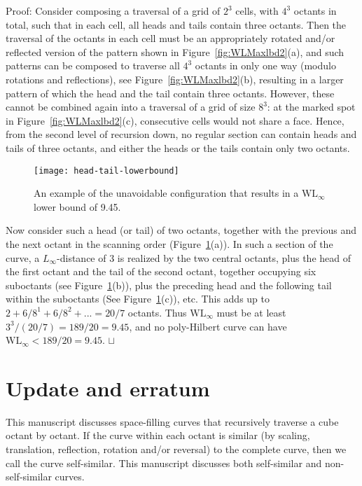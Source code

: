 \documentclass[11pt,a4paper]{article}
\def\WLMax{\ensuremath{\mathrm{WL}_\infty}\xspace}
\newenvironment{proof}{Proof:}{\qed}
\def\squareforqed{\hbox{\rlap{$\sqcap$}$\sqcup$}}
\def\qed{\ifmmode\squareforqed\else{\unskip\nobreak\hfil
\penalty50\hskip1em\null\nobreak\hfil\squareforqed
\parfillskip=0pt\finalhyphendemerits=0\endgraf}\fi}
\begin{document}
\begin{proof}
Consider composing a traversal of a grid of $2^3$ cells, with $4^3$ octants in total, such that in each cell, all heads and tails contain three octants. Then the traversal of the octants in each cell must be an appropriately rotated and/or reflected version of the pattern shown in Figure~\ref{fig:WLMaxlbd2}(a), and such patterns can be composed to traverse all $4^3$ octants in only one way (modulo rotations and reflections), see Figure~\ref{fig:WLMaxlbd2}(b), resulting in a larger pattern of which the head and the tail contain three octants. However, these cannot be combined again into a traversal of a grid of size $8^3$: at the marked spot in Figure~\ref{fig:WLMaxlbd2}(c), consecutive cells would not share a face. Hence, from the second level of recursion down, no regular section can contain heads and tails of three octants, and either the heads or the tails contain only two octants.

\begin{figure}
\centering
\texttt{[image: head-tail-lowerbound]}
\caption{An example of the unavoidable configuration that results in a \WLMax lower bound of 9.45.}
\label{fig:WLMaxlbd3}
\end{figure}

Now consider such a head (or tail) of two octants, together with the previous and the next octant in the scanning order (Figure~\ref{fig:WLMaxlbd3}(a)). In such a section of the curve, a $L_\infty$-distance of 3 is realized by the two central octants, plus the head of the first octant and the tail of the second octant, together occupying six suboctants (see Figure~\ref{fig:WLMaxlbd3}(b)), plus the preceding head and the following tail within the suboctants (See Figure~\ref{fig:WLMaxlbd3}(c)), etc. This adds up to $2 + 6/8^1 + 6/8^2 + ... = 20/7$ octants. Thus $\WLMax$ must be at least $3^3 / (20/7) = 189/20 = 9.45$, and no poly-Hilbert curve can have $\WLMax < 189/20 = 9.45$.
\end{proof}

\clearpage

\section{Update and erratum}\label{apx:update}

This manuscript discusses space-filling curves that recursively traverse a cube octant by octant. If the curve within each octant is similar (by scaling, translation, reflection, rotation and/or reversal) to the complete curve, then we call the curve self-similar. This manuscript discusses both self-similar and non-self-similar curves.
\end{document}
